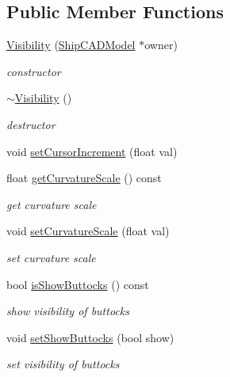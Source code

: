 \subsection*{Public Member Functions}
\begin{DoxyCompactItemize}
\item 
\hyperlink{classShipCAD_1_1Visibility_a7b3d38d4dd65392de8b2bac001afe6e8}{Visibility} (\hyperlink{classShipCAD_1_1ShipCADModel}{Ship\-C\-A\-D\-Model} $\ast$owner)
\begin{DoxyCompactList}\small\item\em constructor \end{DoxyCompactList}\item 
\hyperlink{classShipCAD_1_1Visibility_a653098c74de41abb0a46c455b24c9d3a}{$\sim$\-Visibility} ()
\begin{DoxyCompactList}\small\item\em destructor \end{DoxyCompactList}\item 
void \hyperlink{classShipCAD_1_1Visibility_a665efac6ef5dfdd3baab521fcbd96cb6}{set\-Cursor\-Increment} (float val)
\item 
float \hyperlink{classShipCAD_1_1Visibility_ae8cdc39bcc513f1bb66d0c39fdd1c46a}{get\-Curvature\-Scale} () const 
\begin{DoxyCompactList}\small\item\em get curvature scale \end{DoxyCompactList}\item 
void \hyperlink{classShipCAD_1_1Visibility_a5487027d259912f366351938a1a87085}{set\-Curvature\-Scale} (float val)
\begin{DoxyCompactList}\small\item\em set curvature scale \end{DoxyCompactList}\item 
bool \hyperlink{classShipCAD_1_1Visibility_a293f2a74bb76c65b7fa706e8aac353f1}{is\-Show\-Buttocks} () const 
\begin{DoxyCompactList}\small\item\em show visibility of buttocks \end{DoxyCompactList}\item 
void \hyperlink{classShipCAD_1_1Visibility_a8e7776fdc776e8fa96b7e9bce1cffdce}{set\-Show\-Buttocks} (bool show)
\begin{DoxyCompactList}\small\item\em set visibility of buttocks \end{DoxyCompactList}\item 

\end{DoxyCompactItemize}
